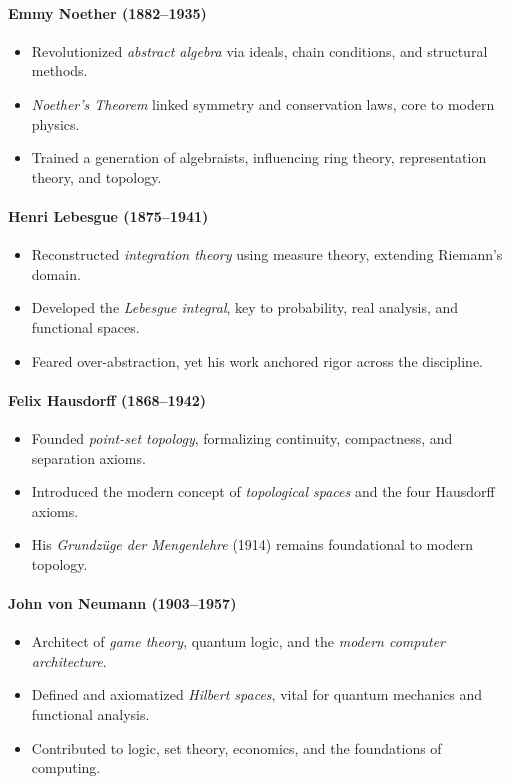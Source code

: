 \documentclass[9pt]{article}
\begin{document}
\paragraph{Emmy Noether (1882--1935)}
\begin{itemize}
  \item Revolutionized \textit{abstract algebra} via ideals, chain conditions, and structural methods.
  \item \textit{Noether’s Theorem} linked symmetry and conservation laws, core to modern physics.
  \item Trained a generation of algebraists, influencing ring theory, representation theory, and topology.
\end{itemize}

\paragraph{Henri Lebesgue (1875--1941)}
\begin{itemize}
  \item Reconstructed \textit{integration theory} using measure theory, extending Riemann’s domain.
  \item Developed the \textit{Lebesgue integral}, key to probability, real analysis, and functional spaces.
  \item Feared over-abstraction, yet his work anchored rigor across the discipline.
\end{itemize}

\paragraph{Felix Hausdorff (1868--1942)}
\begin{itemize}
  \item Founded \textit{point-set topology}, formalizing continuity, compactness, and separation axioms.
  \item Introduced the modern concept of \textit{topological spaces} and the four Hausdorff axioms.
  \item His \textit{Grundzüge der Mengenlehre} (1914) remains foundational to modern topology.
\end{itemize}

\paragraph{John von Neumann (1903--1957)}
\begin{itemize}
  \item Architect of \textit{game theory}, quantum logic, and the \textit{modern computer architecture}.
  \item Defined and axiomatized \textit{Hilbert spaces}, vital for quantum mechanics and functional analysis.
  \item Contributed to logic, set theory, economics, and the foundations of computing.
\end{itemize}
\end{document}
